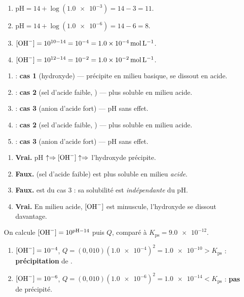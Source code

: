 \documentclass[11pt,a4paper]{article}
\begin{document}
\begin{corrige}
\begin{enumerate}[label=\alph*)]
  \item $\mathrm{pH}=14+\log(\num{1.0e-3})=14-3=11$.
  \item $\mathrm{pH}=14+\log(\num{1.0e-6})=14-6=8$.
  \item $[\ce{OH-}]=10^{10-14}=10^{-4}=\qty{1.0e-4}{\mole\per\litre}$.
  \item $[\ce{OH-}]=10^{12-14}=10^{-2}=\qty{1.0e-2}{\mole\per\litre}$.
\end{enumerate}
\end{corrige}

\begin{corrige}
\begin{enumerate}[label=\alph*)]
  \item {} : \textbf{cas 1} (hydroxyde) — précipite en milieu basique, se dissout en acide.
  \item {} : \textbf{cas 2} (sel d'acide faible, ) — plus soluble en milieu acide.
  \item {} : \textbf{cas 3} (anion d'acide fort) — pH sans effet.
  \item {} : \textbf{cas 2} (sel d'acide faible, ) — plus soluble en milieu acide.
  \item {} : \textbf{cas 3} (anion d'acide fort) — pH sans effet.
\end{enumerate}
\end{corrige}

\begin{corrige}
\begin{enumerate}[label=\alph*)]
  \item \textbf{Vrai.} pH $\uparrow \Rightarrow [\ce{OH-}]\uparrow \Rightarrow$ l'hydroxyde précipite.
  \item \textbf{Faux.}  (sel d'acide faible) est plus soluble en milieu \emph{acide}.
  \item \textbf{Faux.}  est du cas 3 : sa solubilité est \emph{indépendante} du pH.
  \item \textbf{Vrai.} En milieu acide, $[\ce{OH-}]$ est minuscule, l'hydroxyde se dissout davantage.
\end{enumerate}
\end{corrige}

\begin{corrige}
On calcule $[\ce{OH-}]=10^{\mathrm{pH}-14}$ puis $Q$, comparé à $K_{\mathrm{ps}}=\num{9.0e-12}$.
\begin{enumerate}[label=\alph*)]
  \item $[\ce{OH-}]=10^{-4}$, $Q=(0{,}010)(\num{1.0e-4})^{2}=\num{1.0e-10} > K_{\mathrm{ps}}$ :
        \textbf{précipitation} de .
  \item $[\ce{OH-}]=10^{-6}$, $Q=(0{,}010)(\num{1.0e-6})^{2}=\num{1.0e-14} < K_{\mathrm{ps}}$ :
        \textbf{pas} de précipité.
\end{enumerate}
\end{corrige}
\end{document}
